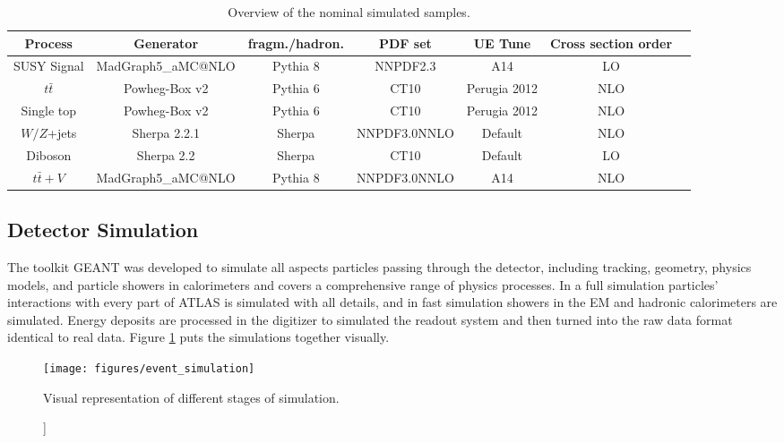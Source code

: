 \begin{table}[htpb]
  \centering
  \small
    \caption{Overview of the nominal simulated samples. }
  \begin{tabular}{ccccccc}
    Process & Generator & fragm./hadron. & PDF set  & UE Tune & Cross section order\\
    \hline 
    \hline
    SUSY Signal & {\sc MadGraph5\_aMC\/@NLO} & {\sc Pythia} 8 & NNPDF2.3 & A14 & LO  & \\ 
    $t\bar{t}$ & {\sc Powheg-Box} v2 & {\sc Pythia} 6 & CT10  & {\sc Perugia 2012} & NLO & \\ 
    Single top & {\sc Powheg-Box} v2 & {\sc Pythia} 6 & CT10  & {\sc Perugia 2012} & NLO & \\ 
    $W/Z$+jets & {\sc Sherpa} 2.2.1 & {\sc Sherpa}  & NNPDF3.0NNLO & Default & NLO & \\ 
    Diboson & {\sc Sherpa} 2.2 & {\sc Sherpa} & CT10 & Default & LO\\ 
    $t\bar{t}+V$ & {\sc MadGraph5\_aMC\/@NLO} & {\sc Pythia} 8 & NNPDF3.0NNLO & A14 & NLO \\ 
    \hline
    \hline
  \end{tabular}
  \label{tab:mc_samples1}
\end{table}

\subsection{Detector Simulation}

The toolkit GEANT\cite{GEANT} was developed to simulate all aspects particles passing through the detector, including tracking, geometry, physics models, and particle showers in calorimeters and covers a comprehensive range of physics processes.  In a full simulation particles' interactions with every part of ATLAS is simulated with all details, and in fast simulation showers in the EM and hadronic calorimeters are simulated.  Energy deposits are processed in the digitizer to simulated the readout system and then turned into the raw data format identical to real data.  Figure \ref{fig:eventsimulation} puts the simulations together visually.

\begin{figure}[!htb]
	\centering
	\texttt{[image: figures/event\_simulation]}
	\caption]{Visual  representation of different stages of simulation\cite{event_simulation:NBartosik}.}
	\label{fig:eventsimulation}
\end{figure}